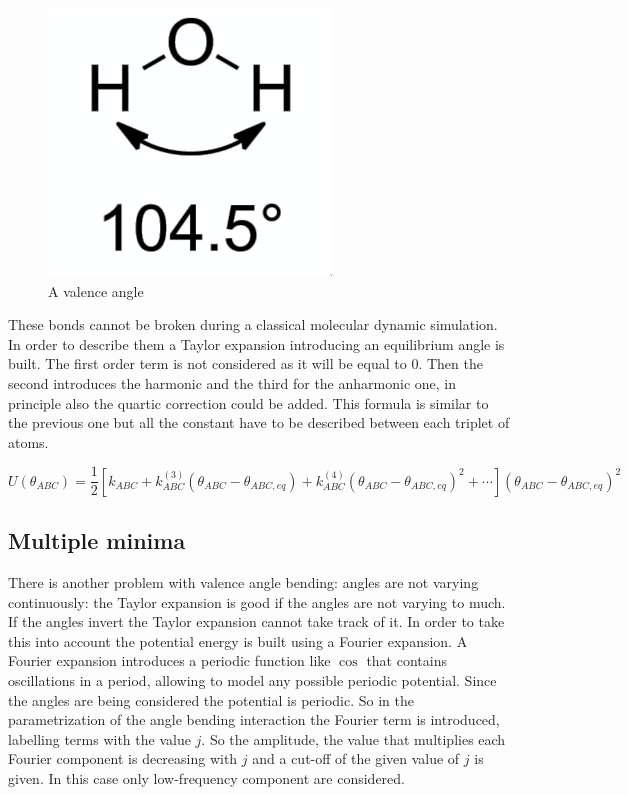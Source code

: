 \begin{figure}[H]
	\includegraphics[width=\textwidth]{valence-angle-bending}
	\caption{A valence angle}
	\label{fig:valence-angle-bending}
\end{figure}

These bonds cannot be broken during a classical molecular dynamic simulation.
In order to describe them a Taylor expansion introducing an equilibrium angle is built.
The first order term is not considered as it will be equal to $0$.
Then the second introduces the harmonic and the third for the anharmonic one, in principle also the quartic correction could be added.
This formula is similar to the previous one but all the constant have to be described between each triplet of atoms.

$$U(\theta_{ABC}) = \frac{1}{2}[k_{ABC}+k^{(3)}_{ABC}(\theta_{ABC}-\theta_{ABC,eq})+k^{(4)}_{ABC}(\theta_{ABC}-\theta_{ABC,eq})^2+\cdots](\theta_{ABC}-\theta_{ABC, eq})^2$$

	\subsection{Multiple minima}
	There is another problem with valence angle bending: angles are not varying continuously: the Taylor expansion is good if the angles are not varying to much.
	If the angles invert the Taylor expansion cannot take track of it.
	In order to take this into account the potential energy is built using a Fourier expansion.
	A Fourier expansion introduces a periodic function like $\cos$ that contains oscillations in a period, allowing to model any possible periodic potential.
	Since the angles are being considered the potential is periodic.
	So in the parametrization of the angle bending interaction the Fourier term is introduced, labelling terms with the value $j$.
	So the amplitude, the value that multiplies each Fourier component is decreasing with $j$ and a cut-off of the given value of $j$ is given.
	In this case only low-frequency component are considered.

